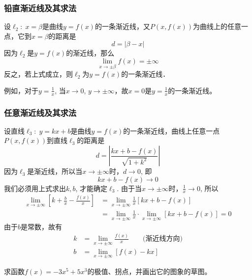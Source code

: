     \subsubsection{铅直渐近线及其求法}
    
    设$\ell_2:\; x=\beta$是曲线$y=f(x)$的一条渐近线，又$P(x,f(x))$为曲线上的任意一点，它到$x=\beta$的距离是
    \[d=|\beta-x|\]
    因为$\ell_2$是$y=f(x)$的渐近线，那么
    \[\lim_{x\to\pm\beta} f (x) =\pm\infty\]
    反之，若上式成立，则$\ell_2$为$y=f(x)$的一条渐近线．
    
    例如，对于$y=\frac{1}{x}$, 当$x\to 0$, $y\to \pm\infty$，故$x=0$是$y=\frac{1}{x}$的一条渐近线。
    
    \subsubsection{任意渐近线及其求法}
    
    设直线$\ell_3:\; y=kx+b$是曲线$y=f(x)$的一条渐近线，曲线上任意一点$P(x,f(x))$到直线$\ell_3$的距离是
    \[d=\left|\frac{kx+b-f(x)}{\sqrt{1+k^2}}\right|\]
    因为$\ell_3$是渐近线，所以当$x\to\pm\infty$时，$d\to 0$, 即
    \[kx+b-f (x) \to 0\]
    我们必须用上式求出$k,b$, 才能确定$\ell_3$. 由于当$x\to\pm\infty$时，$\frac{1}{x}\to 0$, 所以
    \[\begin{split}
    \lim_{x\to\pm\infty}\left[k+\frac{b}{x}-\frac{f(x)}{x}\right]&=\lim_{x\to\pm\infty}\frac{1}{x}[kx+b-f(x)]\\
    &=\lim_{x\to\pm\infty}\frac{1}{x}\cdot \lim_{x\to\pm\infty}[kx+b-f(x)]=0
    \end{split}\]
    由于$b$是常数，故有
    \begin{align}
        k&=\lim_{x\to\pm\infty}\frac{f(x)}{x}\qquad \text{(渐近线方向)}\\
    b&=\lim_{x\to\pm\infty}[f(x)-kx]
    \end{align}
    
    \begin{example}
    求函数$f(x)=-3x^5+5x^3$的极值、拐点，并画出它的图象的草图。
    \end{example}
    
